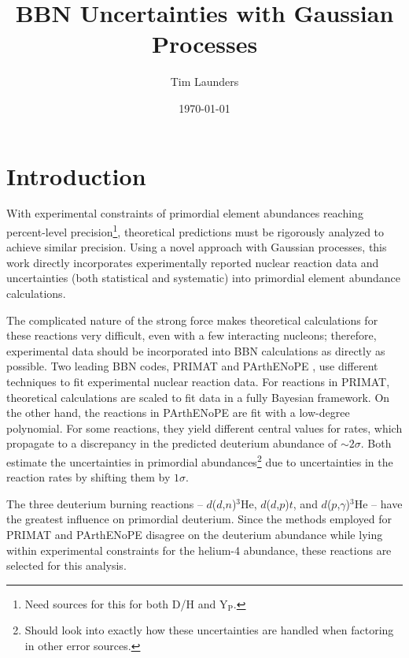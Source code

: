 \documentclass[%
 reprint,
superscriptaddress,
nofootinbib,
 amsmath,amssymb,
 aps,
 pra,
]{revtex4-2}
\makeatletter
\renewcommand\onecolumngrid{%
\do@columngrid{one}{\@ne}%
\def\set@footnotewidth{\textwidth}%
\def\footnoterule{\kern-6pt\hrule width \textwidth\kern6pt}%
}
\makeatother
\begin{document}
\title{BBN Uncertainties with Gaussian Processes}
\author{Tim Launders}

\date{\today}

\maketitle
\setlength{\parskip}{8pt}

\onecolumngrid

\section{Introduction}



With experimental constraints of primordial element abundances reaching percent-level precision\footnote{Need sources for this for both D/H and Y$_\text{P}.$}, theoretical predictions must be rigorously analyzed to achieve similar precision. Using a novel approach with Gaussian processes, this work directly incorporates experimentally reported nuclear reaction data and uncertainties (both statistical and systematic) into primordial element abundance calculations. 

The complicated nature of the strong force makes theoretical calculations for these reactions very difficult, even with a few interacting nucleons; therefore, experimental data should be incorporated into BBN calculations as directly as possible. Two leading BBN codes, PRIMAT \cite{Pitrou2018} and PArthENoPE \cite{Gariazzo2022}, use different techniques to fit experimental nuclear reaction data. For reactions in PRIMAT, theoretical calculations are scaled to fit data in a fully Bayesian framework. On the other hand, the reactions in PArthENoPE are fit with a low-degree polynomial. For some reactions, they yield different central values for rates, which propagate to a discrepancy in the predicted deuterium abundance of $\sim2\sigma$. Both estimate the uncertainties in primordial abundances\footnote{Should look into exactly how these uncertainties are handled when factoring in other error sources.} due to uncertainties in the reaction rates by shifting them by $1\sigma$.

The three deuterium burning reactions -- $d$($d$,$n$)$^3$He, $d$($d$,$p$)$t$, and $d$($p$,$\gamma$)$^3$He -- have the greatest influence on primordial deuterium. Since the methods employed for PRIMAT and PArthENoPE disagree on the deuterium abundance while lying within experimental constraints for the helium-4 abundance, these reactions are selected for this analysis. 
\end{document}
